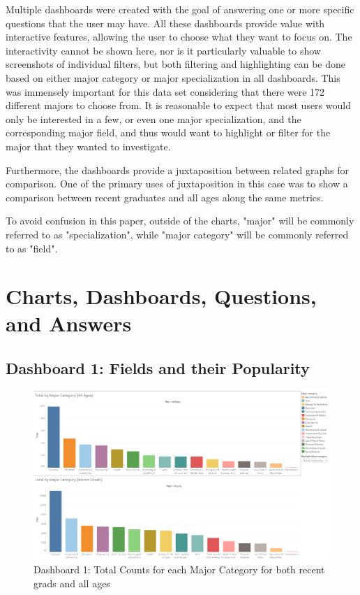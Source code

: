 \documentclass[sigchi]{acmart}
\begin{document}
Multiple dashboards were created with the goal of answering one or more specific questions that the user may have. All these dashboards provide value with interactive features, allowing the user to choose what they want to focus on. The interactivity cannot be shown here, nor is it particularly valuable to show screenshots of individual filters, but both filtering and highlighting can be done based on either major category or major specialization in all dashboards. This was immensely important for this data set considering that there were 172 different majors to choose from. It is reasonable to expect that most users would only be interested in a few, or even one major specialization, and the corresponding major field, and thus would want to highlight or filter for the major that they wanted to investigate.

Furthermore, the dashboards provide a juxtaposition between related graphs for comparison. One of the primary uses of juxtaposition in this case was to show a comparison between recent graduates and all ages along the same metrics. 

To avoid confusion in this paper, outside of the charts, "major" will be commonly referred to as "specialization", while "major category" will be commonly referred to as "field".

\section{Charts, Dashboards, Questions, and Answers}
\subsection{Dashboard 1: Fields and their Popularity}
\label{sec:db1}

  \begin{figure}[thpb]
  \includegraphics[width=1.0\textwidth]{DB1.png}
     \caption{Dashboard 1: Total Counts for each Major Category for both recent grads and all ages}
         \label{fig:db1}
  \end{figure}
  
\end{document}
